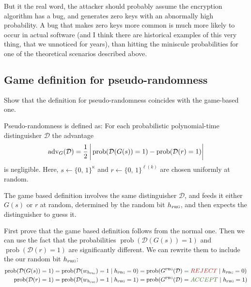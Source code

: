 \documentclass{article}
\begin{document}
  But it the real word, the attacker should probably assume the encryption algorithm has a bug,
  and generates zero keys with an abnormally high probability.
  A bug that makes zero keys more common is much more likely to occur in actual software
  (and I think there are historical examples of this very thing, that we unnoticed for years),
  than hitting the miniscule probabilities for one of the theoretical scenarios described above.

  \subsection{Game definition for pseudo-randomness}
  \begin{centerframebox}
    Show that the definition for pseudo-randomness coincides with the game-based one.

    Pseudo-randomness is defined as:
    For each probabilistic polynomial-time distinguisher $\mathcal{D}$ the advantage
    \[ \operatorname{adv}_G(\mathcal{D}) = \frac{1}{2}\left|
      \vphantom{\frac{1}{2}}
      \operatorname{prob}(\mathcal{D}(G(s)) = 1) -
      \operatorname{prob}(\mathcal{D}(r) = 1)
    \right| \]
    is negligible. Here, $s \leftarrow \{0,\, 1\}^\kappa$ and $r \leftarrow \{0,\, 1\}^{\ell(k)}$ are chosen uniformly at random.

    The game based definition involves the same distinguisher $\mathcal{D}$, and feeds it either $G(s)$ or $r$ at random,
    determined by the random bit $h_\textsc{prg}$, and then expects the distinguisher to guess it.
  \end{centerframebox}
  First prove that the game based definition follows from the normal one.
  Then we can use the fact that the probabilities $\operatorname{prob}(\mathcal{D}(G(s)) = 1)$ and $\operatorname{prob}(\mathcal{D}(r) = 1)$ are significantly different.
  We can rewrite them to include the our random bit $h_\textsc{prg}$:
  \begin{align*}
    \operatorname{prob}(\mathcal{D}(G(s)) = 1) &= \operatorname{prob}(\mathcal{D}(w_{h_\textsc{prg}}) = 1 \mid h_\textsc{prg} = 0)
    = \operatorname{prob}(G^\textsc{prg}(\mathcal{D}) = \textcolor{BrickRed}{REJECT} \mid h_\textsc{prg} = 0)\\
    \operatorname{prob}(\mathcal{D}(r) = 1) &= \operatorname{prob}(\mathcal{D}(w_{h_\textsc{prg}}) = 1 \mid h_\textsc{prg} = 1)
    = \operatorname{prob}(G^\textsc{prg}(\mathcal{D}) = \textcolor{OliveGreen}{ACCEPT} \mid h_\textsc{prg} = 1)
  \end{align*}
\end{document}
